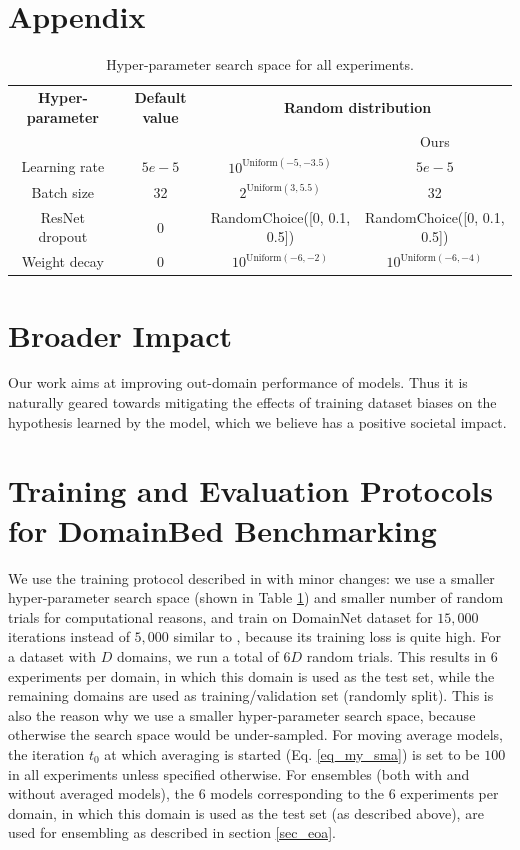 \appendix
\onecolumn
\section*{Appendix}

\begin{table}[]
\centering
\caption{Hyper-parameter search space for all experiments.}
\begin{tabular}{cccc}
\hline
\textbf{Hyper-parameter}   & \textbf{Default value}           & \multicolumn{2}{c}{\textbf{Random distribution}}   \\ 
&& \cite{gulrajani2020search} & Ours\\
\hline
Learning rate & $5e-5$     & $10^{\text{Uniform}(-5, -3.5)}$ & $5e-5$\\
Batch size & 32 & $2^{\text{Uniform}(3, 5.5)}$ & 32\\
ResNet dropout & 0 & RandomChoice([0, 0.1, 0.5]) & RandomChoice([0, 0.1, 0.5])\\
Weight decay & 0 & $10^{\text{Uniform}(-6, -2)}$ & $10^{\text{Uniform}(-6, -4)}$\\
\hline
\end{tabular}
\label{tab:hyper_param}
\end{table}

\section{Broader Impact}
\label{sec_broader_impact}
Our work aims at improving out-domain performance of models. Thus it is naturally geared towards mitigating the effects of training dataset biases on the hypothesis learned by the model, which we believe has a positive societal impact.

\section{Training and Evaluation Protocols for DomainBed Benchmarking}
\label{sec_training_protocol}

We use the training protocol described in \cite{gulrajani2020search} with minor changes: we use a smaller hyper-parameter search space (shown in Table \ref{tab:hyper_param}) and smaller number of random trials for computational reasons, and train on DomainNet dataset for $15,000$ iterations instead of $5,000$ similar to \cite{cha2021swad}, because its training loss is quite high. For a dataset with $D$ domains, we run a total of $6D$ random trials. This results in $6$ experiments per domain, in which this domain is used as the test set, while the remaining domains are used as training/validation set (randomly split). This is also the reason why we use a smaller hyper-parameter search space, because otherwise the search space would be under-sampled. For moving average models, the iteration $t_0$ at which averaging is started (Eq. \ref{eq_my_sma}) is set to be $100$ in all experiments unless specified otherwise. For ensembles (both with and without averaged models), the $6$ models corresponding to the $6$ experiments per domain, in which this domain is used as the test set (as described above), are used for ensembling as described in section \ref{sec_eoa}.

